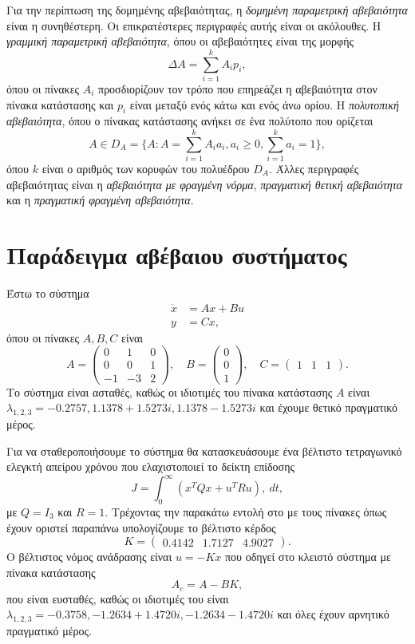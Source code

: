 Για την περίπτωση της δομημένης αβεβαιότητας, η
\emph{δομημένη παραμετρική αβεβαιότητα} είναι η συνηθέστερη. Οι επικρατέστερες
περιγραφές αυτής είναι οι ακόλουθες. Η \emph{γραμμική παραμετρική αβεβαιότητα},
όπου οι αβεβαιότητες είναι της μορφής
\[
    \Delta A = \sum_{i = 1}^k A_i p_i,
\]
όπου οι πίνακες \( A_i \) προσδιορίζουν τον τρόπο που επηρεάζει η αβεβαιότητα
στον πίνακα κατάστασης και \( p_i \) είναι μεταξύ ενός κάτω και ενός άνω ορίου.
Η \emph{πολυτοπική αβεβαιότητα}, όπου ο πίνακας κατάστασης ανήκει σε ένα
πολύτοπο που ορίζεται
\[
    A \in D_A = \{ A: A = \sum_{i = 1}^k A_i a_i, a_i \geq 0, \sum_{i = 1}^k a_i =
    1 \},
\]
όπου \( k \) είναι ο αριθμός των κορυφών του πολυέδρου \( D_A \).
Άλλες περιγραφές αβεβαιότητας είναι η \emph{αβεβαιότητα με φραγμένη νόρμα},
\emph{πραγματική θετική αβεβαιότητα} και η \emph{πραγματική φραγμένη
αβεβαιότητα}.

\section{Παράδειγμα αβέβαιου συστήματος}
Έστω το σύστημα
\begin{align*}
    \dot{x} &= Ax + Bu \\
    y &= Cx,
\end{align*}
όπου οι πίνακες \( A, B, C \) είναι
\[
    A =
    \begin{pmatrix}
        0 & 1 & 0 \\
        0 & 0 & 1 \\
        -1 & -3 & 2
    \end{pmatrix}, \quad
    B = \begin{pmatrix}0 \\ 0 \\ 1\end{pmatrix}, \quad
    C = \begin{pmatrix}1 & 1 & 1\end{pmatrix}.
\]
Το σύστημα είναι ασταθές, καθώς οι ιδιοτιμές του πίνακα κατάστασης
\( A \) είναι \( \lambda_{1,2,3} = -0.2757, 1.1378 + 1.5273i, 1.1378
- 1.5273i \) και έχουμε θετικό πραγματικό μέρος.

Για να σταθεροποιήσουμε το σύστημα θα κατασκευάσουμε ένα βέλτιστο τετραγωνικό
ελεγκτή απείρου χρόνου που ελαχιστοποιεί το δείκτη επίδοσης
\[
    J = \int_0^{\infty} \left( x^{T}Qx + u^{T}Ru \right) ,\ dt,
\]
με \( Q = I_3 \) και \( R = 1 \). Τρέχοντας την παρακάτω εντολή στο 
με τους πίνακες όπως έχουν οριστεί παραπάνω
υπολογίζουμε το βέλτιστο κέρδος
\[
    K = \begin{pmatrix}0.4142 & 1.7127 & 4.9027\end{pmatrix}.
\]
Ο βέλτιστος νόμος ανάδρασης είναι \( u = -Kx \) που οδηγεί στο κλειστό σύστημα
με πίνακα κατάστασης
\[
    A_c = A - BK,
\]
που είναι ευσταθές, καθώς οι ιδιοτιμές του είναι
\( \lambda_{1,2,3} = -0.3758, -1.2634 + 1.4720i,
-1.2634 - 1.4720i \) και όλες έχουν αρνητικό πραγματικό μέρος.

